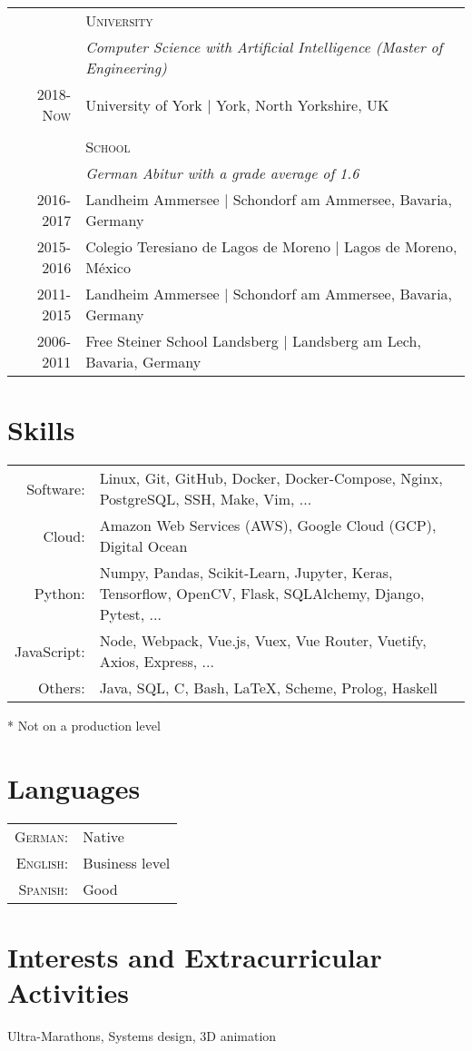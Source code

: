 \documentclass[a4paper,10pt]{article}
\begin{document}
\begin{tabular}{r|p{11cm}}

                    & \textsc{University} \\
                    & \emph{Computer Science with Artificial Intelligence (Master of Engineering)} \\
\textsc{2018-Now}   & University of York | York, North Yorkshire, UK \\
\multicolumn{2}{c}{}\\
                    & \textsc{School} \\
                    & \emph{German \emph{Abitur} with a grade average of 1.6} \\
\textsc{2016-2017}  & Landheim Ammersee | Schondorf am Ammersee, Bavaria, Germany \\
\textsc{2015-2016}  & Colegio Teresiano de Lagos de Moreno |  Lagos de Moreno, México \\
\textsc{2011-2015}  & Landheim Ammersee | Schondorf am Ammersee, Bavaria, Germany \\
\textsc{2006-2011}  & Free Steiner School Landsberg | Landsberg am Lech, Bavaria, Germany \\

\end{tabular}


\section{Skills}
\renewcommand{\thefootnote}{*}
\begin{threeparttable}
\begin{tabular}{ r p{} }
    Software:   & Linux, Git, GitHub, Docker, Docker-Compose, Nginx, PostgreSQL, SSH, Make, Vim, ... \\
    Cloud:      & Amazon Web Services (AWS), Google Cloud (GCP), Digital Ocean
    \vspace{2mm} \\
    Python:     & Numpy, Pandas, Scikit-Learn, Jupyter, Keras, Tensorflow, OpenCV, Flask, SQLAlchemy, Django, Pytest, ... \\
    JavaScript: & Node, Webpack, Vue.js, Vuex, Vue Router, Vuetify, Axios, Express, ... \\
    Others:     & Java, SQL, C, Bash, \LaTeX, Scheme\footnotemark, Prolog\footnotemark, Haskell\footnotemark
\end{tabular}
\begin{tablenotes}
    \small\item[*] Not on a production level
  \end{tablenotes}
\end{threeparttable}

\section{Languages}
\begin{tabular}{rl}
\textsc{German:}  & Native \\
\textsc{English:} & Business level \\
\textsc{Spanish:} & Good \\
\end{tabular}

\section{Interests and Extracurricular Activities }
Ultra-Marathons, Systems design, 3D animation
\end{document}
